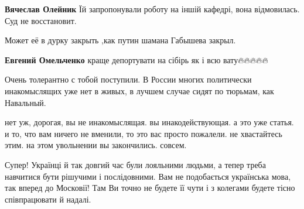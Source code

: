 \begin{itemize}
\begin{itemize}
\textbf{Вячеслав Олейник} Їй запропонували роботу на іншій кафедрі, вона відмовилась. Суд не восстановит.
\end{itemize}

 
Может её в дурку закрыть ,как путин шамана Габышева закрыл.

\begin{itemize}
 
\textbf{Евгений Омельченко} краще депортувати на сібірь як і всю вату🔥🔥🔥🔥🔥
\end{itemize}

 
Очень толерантно с тобой поступили. В России многих политически инакомыслящих уже нет в живых, в лучшем случае сидят по тюрьмам, как Навальный.

 
нет уж, дорогая, вы не инакомыслящая. вы инакодействующая. а это уже статья. и то, что вам ничего не вменили, то это вас просто пожалели. не хвастайтесь этим. на этом увольнении вы закончились. совсем.

 
Супер! Українці й так довгий час були лояльними людьми, а тепер треба навчитися бути рішучими і послідовними. Вам не подобається українська мова, так вперед до Московії! Там Ви точно не будете її чути і з колегами будете тісно співпрацювати й надалі.


\end{itemize}
